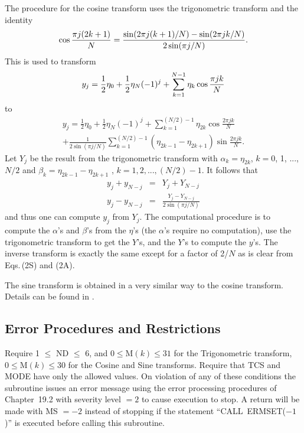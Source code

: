 \documentclass[twoside]{MATH77}
\begin{document}
The procedure for the cosine transform uses the trigonometric transform and
the identity%
\begin{equation*}
\hspace{-0pt}\cos \frac{\pi j(2k+1)}N=\frac{\sin (2\pi j(k+1)/N)-\sin
(2\pi jk/N)}{2\sin (\pi j/N)}.
\end{equation*}
This is used to transform%
\begin{equation*}
y_j=\frac 12\eta _0+\frac 12\eta _N(-1)^j+\sum_{k=1}^{N-1}\eta _k\cos \frac{%
\pi jk}N
\end{equation*}
to%
\begin{multline*}
y_j=\frac 12\eta _0+\frac 12\eta _N(-1)^j+\sum_{k=1}^{(N/2)-1}\eta _{2k}\cos
\frac{2\pi jk}N\\
+\frac 1{2\sin (\pi j/N)}\sum_{k=1}^{(N/2)-1}(\eta
_{2k-1}-\eta _{2k+1})\sin \frac{2\pi jk}N.
\end{multline*}
Let $Y_j$ be the result from the trigonometric transform with $\alpha
_k=\eta _{2k}$, $k=0$, 1, ..., $N/2$ and $\beta _k=\eta _{2k-1}-\eta _{2k+1}$%
, $k=1,2,...,(N/2)-1$. It follows that%
\begin{eqnarray*}
   y_j+y_{N-j}   & = & Y_j+Y_{N-j} \\
   y_j-y_{N-j}  & = & \frac{Y_j-Y_{N-j}}{2\sin (\pi j/N)}
\end{eqnarray*}
and thus one can compute $y_j$ from $Y_j$. The computational
procedure is to compute the $\alpha $'s and $\beta $'s
from the $\eta $'s (the $\alpha $'s require no
computation), use the trigonometric transform to get the $Y$'s, and
the $Y$'s to compute the $y$'s. The inverse transform is
exactly the same except for a factor of 2/$N$ as is clear from
Eqs.\,(2S) and (2A).

The sine transform is obtained in a very similar way to the cosine
transform. Details can be found in \cite{Krogh:1970:SCT}.




\subsection{Error Procedures and Restrictions}

Require 1 $\leq $ ND $\leq $ 6, and $0 \leq \text{M}(k)\leq 31$ for the
Trigonometric transform, $0 \leq \text{M}(k)\leq 30$ for the Cosine and
Sine transforms.  Require that TCS and MODE have only the allowed values.
On violation of any of these conditions the subroutine issues an error
message using the error processing procedures of Chapter~19.2 with
severity level $=2$ to cause execution to stop.  A return will be made
with MS $=-2$ instead of stopping if the statement ``CALL\ ERMSET($-1$)''
is executed before calling this subroutine.
\end{document}
